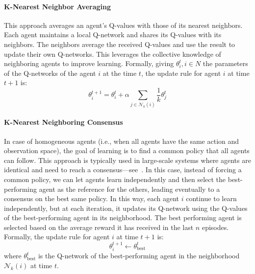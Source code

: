\documentclass[sigconf]{acmart}
\begin{document}
\paragraph{K-Nearest Neighbor Averaging}
\sloppy
This approach averages an agent's Q-values with those of its nearest neighbors. 
Each agent maintains a local Q-network and shares its Q-values with its neighbors. 
The neighbors average the received Q-values and use the result to update their own Q-networks. 
This leverages the collective knowledge of neighboring agents to improve learning.
%
Formally, giving $\theta^t_i, i \in N$ the parameters of the Q-networks of the agent $i$ at the time $t$,
the update rule for agent $i$ at time $t+1$ is:
\begin{equation}
  \theta^{t+1}_i = \theta^t_i + \alpha \sum_{j \in \mathcal{N}_k(i)} \frac{1}{k} \theta^t_j
\end{equation}

\paragraph{K-Nearest Neighboring Consensus}
In case of homogeneous agents (i.e., when all agents have the same action and observation space),
the goal of learning is to find a common policy that all agents can follow.
This approach is typically used in large-scale systems where agents are identical and need to reach a consensus---see~\cite{DBLP:conf/eusipco/BaldazoPZ19}.
%
In this case, instead of forcing a common policy, we can let agents learn independently and then select the best-performing agent as the reference for the others, leading eventually to a consensus on the best same policy.
%
In this way, each agent $i$ continue to learn independently, but at each iteration, it updates its Q-network using the Q-values of the best-performing agent in its neighborhood.
%
The best performing agent is selected based on the average reward it has received in the last $n$ episodes.
Formally, the update rule for agent $i$ at time $t+1$ is:
\begin{equation}
  \theta^{t+1}_i \leftarrow \theta^t_{\text{best}}
\end{equation}
where $\theta^t_{\text{best}}$ is the Q-network of the best-performing agent in the neighborhood $\mathcal{N}_k(i)$ at time $t$.
\end{document}
